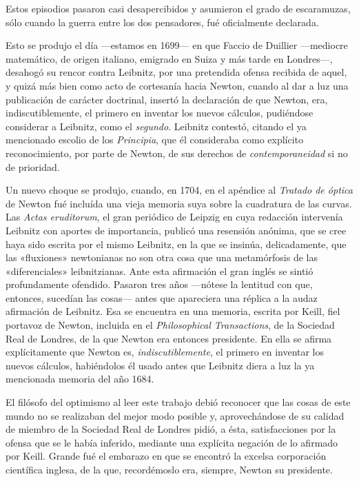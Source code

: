 \documentclass[a4paper, 12pt, draft]{article}
\begin{document}
{Estos episodios pasaron casi desapercibidos y asumieron el grado de escaramuzas, sólo cuando la guerra entre los dos pensadores, fué oficialmente declarada.

Esto se produjo el día ---estamos en 1699--- en que Faccio de Duillier ---mediocre matemático, de origen italiano, emigrado en Suiza y más tarde en Londres---, desahogó su rencor contra Leibnitz, por una pretendida ofensa recibida de aquel, y quizá más bien como acto de cortesanía hacia Newton, cuando al dar a luz una publicación de carácter doctrinal, insertó la declaración de que Newton, era, indiscutiblemente, el primero en inventar los nuevos cálculos, pudiéndose considerar a Leibnitz, como el \textit{ segundo}. Leibnitz contestó, citando el ya mencionado escolio de los \textit{ Principia}, que él consideraba como explícito reconocimiento, por parte de Newton, de sus derechos de \textit{ contemporaneidad} si no de prioridad.

Un nuevo choque se produjo, cuando, en 1704, en el apéndice al \textit{ Tratado de óptica} de Newton fué incluída una vieja memoria suya sobre la cuadratura de las curvas. Las \textit{ Actas eruditorum}, el gran periódico de Leipzig en cuya redacción intervenía Leibnitz con aportes de importancia, publicó una resensión anónima, que se cree haya sido escrita por el mismo Leibnitz, en la que se insinúa, delicadamente, que las «fluxiones» newtonianas no son otra cosa que una metamórfosis de las «diferenciales» leibnitzianas. Ante esta afirmación el gran inglés se sintió profundamente ofendido. Pasaron tres años ---nótese la lentitud con que, entonces, sucedían las cosas--- antes que apareciera una réplica a la audaz afirmación de Leibnitz. Esa se encuentra en una memoria, escrita por Keill, fiel portavoz de Newton, incluida en el \textit{ Philosophical Transactions}, de la Sociedad Real de Londres, de la que Newton era entonces presidente. En ella se afirma explícitamente que Newton es, \textit{ indiscutiblemente}, el primero en inventar los nuevos cálculos, habiéndolos él usado antes que Leibnitz diera a luz la ya mencionada memoria del año 1684.

El filósofo del optimismo al leer este trabajo debió reconocer que las cosas de este mundo no se realizaban del mejor modo posible y, aprovechándose de su calidad de miembro de la Sociedad Real de Londres pidió, a ésta, satisfacciones por la ofensa que se le había inferido, mediante una explícita negación de lo afirmado por Keill. Grande fué el embarazo en que se encontró la excelsa corporación científica inglesa, de la que, recordémoslo era, siempre, Newton su presidente.

}
\end{document}
